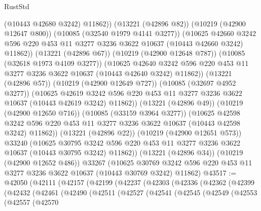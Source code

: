 \begin{lexlean}{RustStd}
\begin{coremodule}
                  (@10443 @42680 @3242)
                  @11862))
              (@13221 (@42896 @82))
              (@10219 (@42900 @12647 @800))
              (@10085 (@32540 @1979 @4141 @3277))
              (@10625
                @42660
                @3242
                @596
                @220
                @453
                @11
                @3277
                @3236
                @3622
                @10637
                (@10443 @42660 @3242)
                @11862))
            (@13221 (@42896 @67))
            (@10219 (@42900 @12648 @787))
            (@10085 (@32618 @1973 @4109 @3277))
            (@10625
              @42640
              @3242
              @596
              @220
              @453
              @11
              @3277
              @3236
              @3622
              @10637
              (@10443 @42640 @3242)
              @11862))
          (@13221 (@42896 @57))
          (@10219 (@42900 @12649 @727))
          (@10085 (@32697 @4952 @3277))
          (@10625
            @42619
            @3242
            @596
            @220
            @453
            @11
            @3277
            @3236
            @3622
            @10637
            (@10443 @42619 @3242)
            @11862))
        (@13221 (@42896 @49))
        (@10219 (@42900 @12650 @716))
        (@10085 (@33159 @3964 @3277))
        (@10625
          @42598
          @3242
          @596
          @220
          @453
          @11
          @3277
          @3236
          @3622
          @10637
          (@10443 @42598 @3242)
          @11862))
      (@13221 (@42896 @22))
      (@10219 (@42900 @12651 @573))
      @33240
      (@10625
        @30795
        @3242
        @596
        @220
        @453
        @11
        @3277
        @3236
        @3622
        @10637
        (@10443 @30795 @3242)
        @11862))
    (@13221 (@42896 @34))
    (@10219 (@42900 @12652 @486))
    @33267
    (@10625 @30769 @3242 @596 @220 @453 @11 @3277 @3236 @3622 @10637 (@10443 @30769 @3242) @11862)
@43517 := @42050
    (@42111
      (@42157
        (@42199
          (@42237
            (@42303
              (@42336
                (@42362
                  (@42399
                    (@42432
                      (@42461
                        (@42490
                          (@42511
                            (@42527
                              (@42541
                                (@42545
                                  (@42549
                                    (@42553
                                      (@42557
                                        (@42570

\end{coremodule}
\end{lexlean}
